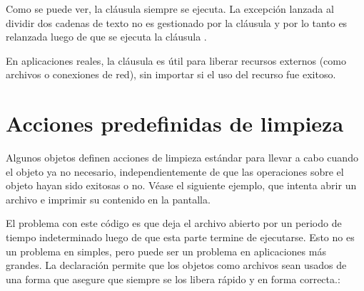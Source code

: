 \documentclass[a5paper,10pt,spanish]{sphinxmanual}
\begin{document}
\sphinxAtStartPar
Como se puede ver, la cláusula  siempre se ejecuta.  La excepción  lanzada al dividir dos cadenas de texto no es gestionado por la cláusula  y por lo tanto es relanzada luego de que se ejecuta la cláusula .

\sphinxAtStartPar
En aplicaciones reales, la cláusula  es útil para liberar recursos externos (como archivos o conexiones de red), sin importar si el uso del recurso fue exitoso.


\section{Acciones predefinidas de limpieza}
\label{\detokenize{tutorial/errors:predefined-clean-up-actions}}\label{\detokenize{tutorial/errors:tut-cleanup-with}}
\sphinxAtStartPar
Algunos objetos definen acciones de limpieza estándar para llevar a cabo cuando el objeto ya no necesario, independientemente de que las operaciones sobre el objeto hayan sido exitosas o no. Véase el siguiente ejemplo, que intenta abrir un archivo e imprimir su contenido en la pantalla.

\begin{sphinxVerbatim}[commandchars=\\\{\}]
   
     
\end{sphinxVerbatim}

\sphinxAtStartPar
El problema con este código es que deja el archivo abierto por un periodo de tiempo indeterminado luego de que esta parte termine de ejecutarse.  Esto no es un problema en  simples, pero puede ser un problema en aplicaciones más grandes.  La declaración  permite que los objetos como archivos sean usados de una forma que asegure que siempre se los libera rápido y en forma correcta.:

\begin{sphinxVerbatim}[commandchars=\\\{\}]
   
       
         
\end{sphinxVerbatim}
\end{document}
